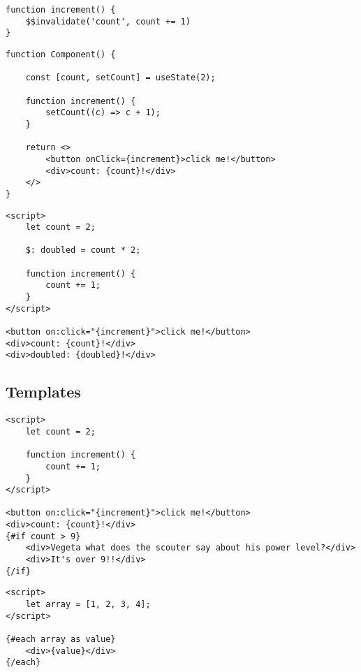 \begin{verbatim}
function increment() {
    $$invalidate('count', count += 1)
}
\end{verbatim}

\begin{verbatim}
function Component() {

    const [count, setCount] = useState(2);

    function increment() {
        setCount((c) => c + 1);
    }

    return <>
        <button onClick={increment}>click me!</button>
        <div>count: {count}!</div>
    </>
}
\end{verbatim}


\begin{verbatim}
<script>
    let count = 2;

    $: doubled = count * 2;

    function increment() {
        count += 1;
    }
</script>

<button on:click="{increment}">click me!</button>
<div>count: {count}!</div>
<div>doubled: {doubled}!</div>
\end{verbatim}


\subsection{Templates}


\begin{verbatim}
<script>
    let count = 2;

    function increment() {
        count += 1;
    }
</script>

<button on:click="{increment}">click me!</button>
<div>count: {count}!</div>
{#if count > 9}
    <div>Vegeta what does the scouter say about his power level?</div>
    <div>It's over 9!!</div>
{/if}
\end{verbatim}

\begin{verbatim}
<script>
    let array = [1, 2, 3, 4];
</script>

{#each array as value}
    <div>{value}</div>
{/each}
\end{verbatim}

